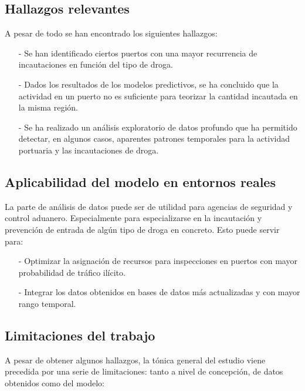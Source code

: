 \documentclass[12pt]{article}
\begin{document}
	\subsection{Hallazgos relevantes}
	A pesar de todo se han encontrado los siguientes hallazgos:
	\begin{itemize}
		\item [-] Se han identificado ciertos puertos con una mayor recurrencia de incautaciones en función del tipo de droga.
		\item [-] Dados los resultados de los modelos predictivos, se ha concluido que la actividad en un puerto no es suficiente para teorizar la cantidad incautada en la misma región.
		\item [-] Se ha realizado un análisis exploratorio de datos profundo que ha permitido detectar, en algunos casos, aparentes patrones temporales para la actividad portuaria y las incautaciones de droga.
	\end{itemize}
	
	\subsection{Aplicabilidad del modelo en entornos reales}
	La parte de análisis de datos puede ser de utilidad para agencias de seguridad y control aduanero. Especialmente para especializarse en la incautación y prevención de entrada de algún tipo de droga en concreto. Esto puede servir para:
	\begin{itemize}
		\item [-] Optimizar la asignación de recursos para inspecciones en puertos con mayor probabilidad de tráfico ilícito.
		\item [-] Integrar los datos obtenidos en bases de datos más actualizadas y con mayor rango temporal.
	\end{itemize}
	
	\subsection{Limitaciones del trabajo}
	A pesar de obtener algunos hallazgos, la tónica general del estudio viene precedida por una serie de limitaciones: tanto a nivel de concepción, de datos obtenidos como del modelo:
	
\end{document}
